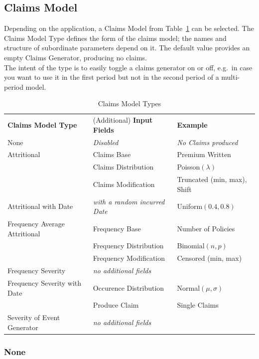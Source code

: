 \subsection{Claims Model}
\label{sec:ClaimsModel}
\label{subsec:ClaimsModel}

Depending on the application, a Claims Model  from Table~\ref{tab:ClaimsModelType} can be selected. The Claims Model Type defines the form of the claims model; the names and structure of subordinate parameters depend on it. The default value  provides an empty Claims Generator, producing no claims. \\ The intent of the  type is to easily toggle a claims generator on or off, e.g.~in case you want to use it in the first period but not in the second period of a multi-period model. 

\begin{table}[htbp]
	\centering
		\begin{tabular}{lll}
			\textbf{Claims Model Type} & (Additional) \textbf{Input Fields} & \textbf{Example} \\
			None & \textit{Disabled} & \textit{No Claims produced} \\
			Attritional & Claims Base & Premium Written \\
				& Claims Distribution & Poisson$(\lambda)$ \\
				& Claims Modification & Truncated (min, max), Shift\\
			Attritional with Date & \textit{with a random incurred Date} & Uniform$(0.4,0.8)$ \\
			Frequency Average Attritional & Frequency Base & Number of Policies \\
				& Frequency Distribution & Binomial$(n, p)$ \\
				& Frequency Modification & Censored (min, max) \\
			Frequency Severity & \textit{no additional fields} \\
			Frequency Severity with Date & Occurence Distribution & Normal$(\mu, \sigma)$\\
				& Produce Claim & Single Claims \\
			Severity of Event Generator & \textit{no additional fields} \\
		\end{tabular}
	\caption{Claims Model Types}
	\label{tab:ClaimsModelType}
\end{table}

\subsubsection*{None}


